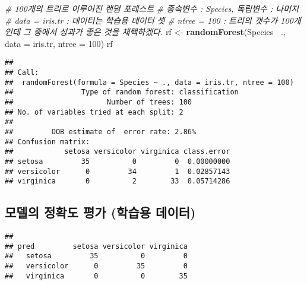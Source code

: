 \documentclass[]{article}
\newenvironment{Shaded}{\begin{snugshade}}{\end{snugshade}}
\newcommand{\KeywordTok}[1]{\textcolor[rgb]{0.13,0.29,0.53}{\textbf{#1}}}
\newcommand{\DataTypeTok}[1]{\textcolor[rgb]{0.13,0.29,0.53}{#1}}
\newcommand{\DecValTok}[1]{\textcolor[rgb]{0.00,0.00,0.81}{#1}}
\newcommand{\StringTok}[1]{\textcolor[rgb]{0.31,0.60,0.02}{#1}}
\newcommand{\CommentTok}[1]{\textcolor[rgb]{0.56,0.35,0.01}{\textit{#1}}}
\newcommand{\OperatorTok}[1]{\textcolor[rgb]{0.81,0.36,0.00}{\textbf{#1}}}
\newcommand{\NormalTok}[1]{#1}
\begin{document}
\begin{Shaded}
\begin{Highlighting}[]
\CommentTok{# 100개의 트리로 이루어진 랜덤 포레스트}
\CommentTok{# 종속변수 : Species, 독립변수 : 나머지}
\CommentTok{# data = iris.tr : 데이터는 학습용 데이터 셋}
\CommentTok{# ntree = 100 : 트리의 갯수가 100개인데 그 중에서 성과가 좋은 것을 채택하겠다.}
\NormalTok{rf <-}\StringTok{ }\KeywordTok{randomForest}\NormalTok{(Species }\OperatorTok{~}\NormalTok{., }\DataTypeTok{data =}\NormalTok{ iris.tr, }\DataTypeTok{ntree =} \DecValTok{100}\NormalTok{)}
\NormalTok{rf}
\end{Highlighting}
\end{Shaded}

\begin{verbatim}
## 
## Call:
##  randomForest(formula = Species ~ ., data = iris.tr, ntree = 100) 
##                Type of random forest: classification
##                      Number of trees: 100
## No. of variables tried at each split: 2
## 
##         OOB estimate of  error rate: 2.86%
## Confusion matrix:
##            setosa versicolor virginica class.error
## setosa         35          0         0  0.00000000
## versicolor      0         34         1  0.02857143
## virginica       0          2        33  0.05714286
\end{verbatim}

\subsection{모델의 정확도 평가 (학습용 데이터)}\label{----}

\begin{Shaded}
\end{Shaded}

\begin{verbatim}
##             
## pred         setosa versicolor virginica
##   setosa         35          0         0
##   versicolor      0         35         0
##   virginica       0          0        35
\end{verbatim}
\end{document}
